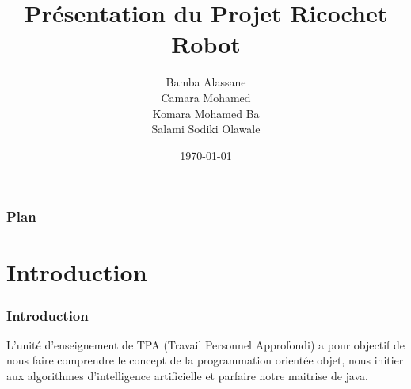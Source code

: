 \documentclass{beamer}
\title{Présentation du Projet Ricochet Robot}
\author{Bamba Alassane
	\\Camara Mohamed
	\\Komara Mohamed Ba
	\\Salami Sodiki Olawale}
\date{\today}
\institute{Université de Caen Normandie}
\begin{document}
	
	\maketitle
	
	\begin{frame} 
		\frametitle{Plan}
		\tableofcontents
	\end{frame}
	\section{Introduction}
	
	\begin{frame}
		\frametitle{Introduction}
		
		L’unité d’enseignement de TPA (Travail Personnel Approfondi) a pour
		objectif de nous faire comprendre le concept de la programmation orientée
		objet, nous initier aux algorithmes d’intelligence artificielle et parfaire notre
		maitrise de java.
		
	\end{frame}
	
\end{document}
